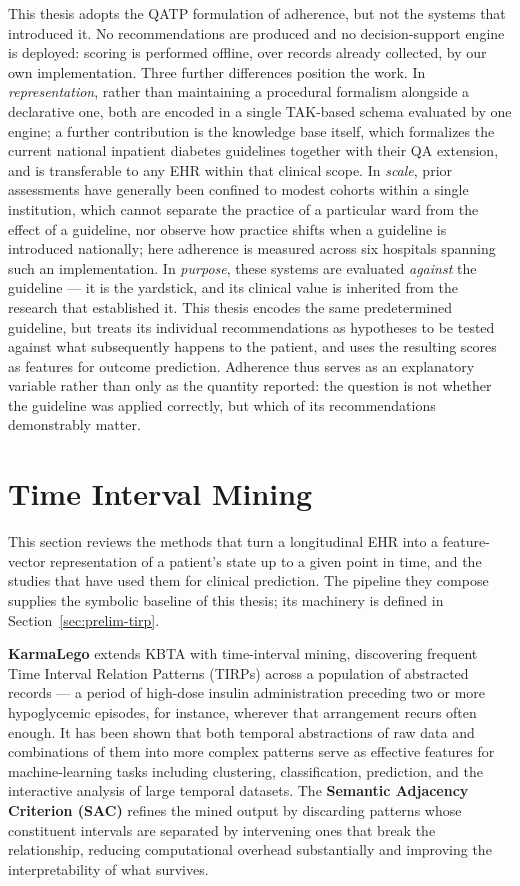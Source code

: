 This thesis adopts the QATP formulation of adherence, but not the systems that introduced it. No recommendations are produced and no decision-support engine is deployed: scoring is performed offline, over records already collected, by our own implementation. Three further differences position the work. In \emph{representation}, rather than maintaining a procedural formalism alongside a declarative one, both are encoded in a single TAK-based schema evaluated by one engine; a further contribution is the knowledge base itself, which formalizes the current national inpatient diabetes guidelines together with their QA extension, and is transferable to any EHR within that clinical scope. In \emph{scale}, prior assessments have generally been confined to modest cohorts within a single institution, which cannot separate the practice of a particular ward from the effect of a guideline, nor observe how practice shifts when a guideline is introduced nationally; here adherence is measured across six hospitals spanning such an implementation. In \emph{purpose}, these systems are evaluated \emph{against} the guideline --- it is the yardstick, and its clinical value is inherited from the research that established it. This thesis encodes the same predetermined guideline, but treats its individual recommendations as hypotheses to be tested against what subsequently happens to the patient, and uses the resulting scores as features for outcome prediction. Adherence thus serves as an explanatory variable rather than only as the quantity reported: the question is not whether the guideline was applied correctly, but which of its recommendations demonstrably matter.

\section{Time Interval Mining}
\label{sec:rw-mining}

This section reviews the methods that turn a longitudinal EHR into a feature-vector representation of a patient's state up to a given point in time, and the studies that have used them for clinical prediction. The pipeline they compose supplies the symbolic baseline of this thesis; its machinery is defined in Section~\ref{sec:prelim-tirp}.

\textbf{KarmaLego} \citep{moskovitch2015karmalego} extends KBTA with time-interval mining, discovering frequent Time Interval Relation Patterns (TIRPs) across a population of abstracted records --- a period of high-dose insulin administration preceding two or more hypoglycemic episodes, for instance, wherever that arrangement recurs often enough. It has been shown that both temporal abstractions of raw data and combinations of them into more complex patterns serve as effective features for machine-learning tasks including clustering, classification, prediction, and the interactive analysis of large temporal datasets. The \textbf{Semantic Adjacency Criterion (SAC)} \citep{sac-time-intervals-mining} refines the mined output by discarding patterns whose constituent intervals are separated by intervening ones that break the relationship, reducing computational overhead substantially and improving the interpretability of what survives.

